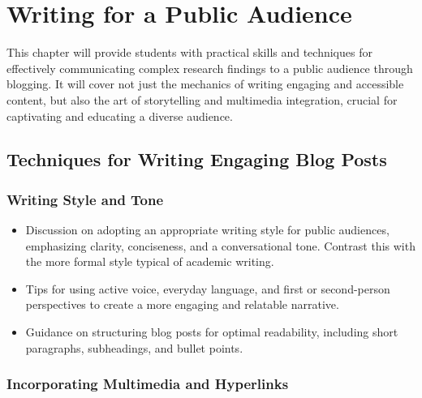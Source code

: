 \documentclass[
]{book}
\begin{document}
\hypertarget{writing-for-a-public-audience}{%
\chapter{Writing for a Public Audience}\label{writing-for-a-public-audience}}

This chapter will provide students with practical skills and techniques for effectively communicating complex research findings to a public audience through blogging. It will cover not just the mechanics of writing engaging and accessible content, but also the art of storytelling and multimedia integration, crucial for captivating and educating a diverse audience.

\hypertarget{techniques-for-writing-engaging-blog-posts}{%
\section*{Techniques for Writing Engaging Blog Posts}\label{techniques-for-writing-engaging-blog-posts}}

\hypertarget{writing-style-and-tone}{%
\subsection*{Writing Style and Tone}\label{writing-style-and-tone}}

\begin{itemize}
\item
  Discussion on adopting an appropriate writing style for public audiences, emphasizing clarity, conciseness, and a conversational tone. Contrast this with the more formal style typical of academic writing.
\item
  Tips for using active voice, everyday language, and first or second-person perspectives to create a more engaging and relatable narrative.
\item
  Guidance on structuring blog posts for optimal readability, including short paragraphs, subheadings, and bullet points.
\end{itemize}

\hypertarget{incorporating-multimedia-and-hyperlinks}{%
\subsection*{Incorporating Multimedia and Hyperlinks}\label{incorporating-multimedia-and-hyperlinks}}
\end{document}
